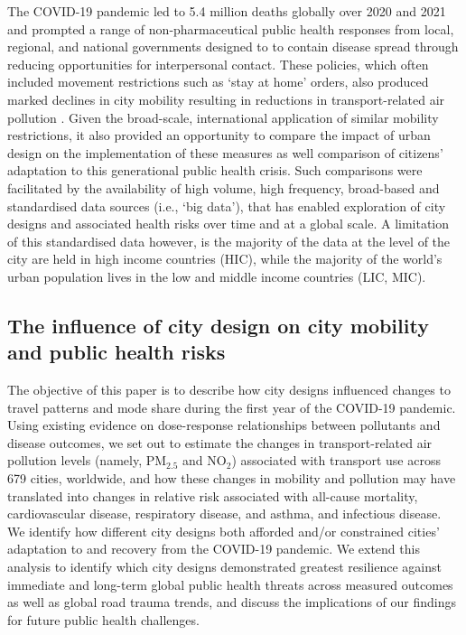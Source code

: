 \documentclass[preprint,10pt]{elsarticle} %
\begin{document}
The COVID-19 pandemic led to 5.4 million deaths globally over 2020 and 2021 \cite{Taylor2022} and prompted a range of non-pharmaceutical public health responses from local, regional, and national governments\cite{Hunter2023LPH} designed to to contain disease spread through reducing opportunities for interpersonal contact. These policies, which often included movement restrictions such as `stay at home' orders, also produced marked declines in city mobility resulting in reductions in transport-related air pollution \cite{Forster2020,He2020,LeQuere2020,Venter2020,thompson2022modelling}. Given the broad-scale, international application of similar mobility restrictions, it also provided an opportunity to compare the impact of urban design on the implementation of these measures as well comparison of citizens' adaptation to this generational public health crisis. Such comparisons were facilitated by the availability of high volume, high frequency, broad-based and standardised data sources (i.e., `big data'), that has enabled exploration of city designs and associated health risks over time and at a global scale. A limitation of this standardised data however, is the majority of the data at the level of the city are held in high income countries (HIC), while the majority of the world's urban population lives in the low and middle income countries (LIC, MIC)\cite{Smit2021}.

%

\subsection*{The influence of city design on city mobility and public health risks}
The objective of this paper is to describe how city designs influenced changes to travel patterns and mode share during the first year of the COVID-19 pandemic. Using existing evidence on dose-response relationships between pollutants and disease outcomes, we set out to estimate the changes in transport-related air pollution levels (namely, PM$_{2.5}$ and NO$_{2}$) associated with transport use across 679 cities, worldwide, and how these changes in mobility and pollution may have translated into changes in relative risk associated with all-cause mortality, cardiovascular disease, respiratory disease, and asthma, and infectious disease. We identify how different city designs both afforded and/or constrained cities' adaptation to and recovery from the COVID-19 pandemic. We extend this analysis to identify which city designs demonstrated greatest resilience against immediate and long-term global public health threats across measured outcomes as well as global road trauma trends, and discuss the implications of our findings for future public health challenges.
\end{document}
